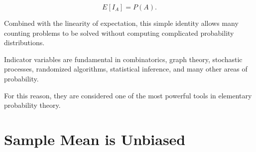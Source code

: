 \documentclass[11pt]{article}
\begin{document}
\begin{mdframed}[
		linewidth=0.8pt,
		roundcorner=6pt,
		backgroundcolor=gray!5,
		linecolor=gray!60,
		innertopmargin=10pt,
		innerbottommargin=10pt,
		innerleftmargin=10pt,
		innerrightmargin=10pt
		]
		\[
		\boxed{
			E[I_A]=P(A).
		}
		\]
		
		Combined with the linearity of expectation, this simple identity allows many
		counting problems to be solved without computing complicated probability
		distributions.
		
		Indicator variables are fundamental in combinatorics, graph theory,
		stochastic processes, randomized algorithms, statistical inference, and many
		other areas of probability.
		
		For this reason, they are considered one of the most powerful tools in
		elementary probability theory.
		
	\end{mdframed}
	
	\section{Sample Mean is Unbiased}
	
\end{document}
